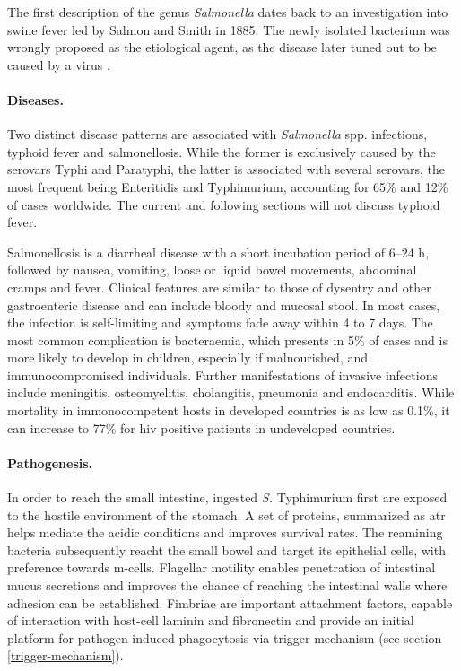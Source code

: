 The first description of the genus \textit{Salmonella} dates back to an investigation into swine fever led by Salmon and Smith in 1885. The newly isolated bacterium was wrongly proposed as the etiological agent, as the disease later tuned out to be caused by a virus \citep{Fabrega2013}.

\paragraph{Diseases.}
Two distinct disease patterns are associated with \textit{Salmonella} spp. infections, typhoid fever and salmonellosis. While the former is exclusively caused by the serovars Typhi and Paratyphi, the latter is associated with several serovars, the most frequent being Enteritidis and Typhimurium, accounting for 65\% and 12\% of cases worldwide. The current and following sections will not discuss typhoid fever.

Salmonellosis is a diarrheal disease with a short incubation period of 6--24 h, followed by nausea, vomiting, loose or liquid bowel movements, abdominal cramps and fever. Clinical features are similar to those of dysentry and other gastroenteric disease and can include bloody and mucosal stool. In most cases, the infection is self-limiting and symptoms fade away within 4 to 7 days. The most common complication is bacteraemia, which presents in 5\% of cases and is more likely to develop in children, especially if malnourished, and immunocompromised individuals. Further manifestations of invasive infections include meningitis, osteomyelitis, cholangitis, pneumonia and endocarditis. While mortality in immonocompetent hosts in developed countries is as low as 0.1\%, it can increase to 77\% for \gls{hiv} positive patients in undeveloped countries.

\paragraph{Pathogenesis.}
In order to reach the small intestine, ingested \textit{S.} Typhimurium first are exposed to the hostile environment of the stomach. A set of proteins, summarized as \gls{atr} helps mediate the acidic conditions and improves survival rates. The reamining bacteria subsequently reacht the small bowel and target its epithelial cells, with preference towards \gls{m-cells}. Flagellar motility enables penetration of intestinal mucus secretions and improves the chance of reaching the intestinal walls where adhesion can be established. Fimbriae are important attachment factors, capable of interaction with host-cell laminin and fibronectin and provide an initial platform for pathogen induced phagocytosis via trigger mechanism (see section \ref{trigger-mechanism}). 

